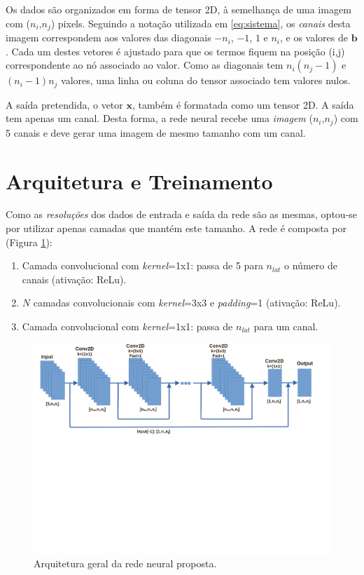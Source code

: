 \documentclass[final,5p]{elsarticle}
\numberwithin{equation}{section}
\begin{document}
    Os dados são organizados em forma de tensor 2D, à semelhança de uma imagem com ($n_i$,$n_j$) pixels. Seguindo a notação utilizada em \ref{eq:sistema}, os \emph{canais} desta imagem correspondem aos valores das diagonais $-n_i$, $-1$, $1$ e $n_i$, e os valores de $\textbf{b}$. Cada um destes vetores é ajustado para que os termos fiquem na posição (i,j) correspondente ao nó associado ao valor. Como as diagonais tem $n_i(n_j-1)$ e $(n_i-1)n_j$ valores, uma linha ou coluna do tensor associado tem valores nulos.

    A saída pretendida, o vetor $\textbf{x}$, também é formatada como um tensor 2D. A saída tem apenas um canal. Desta forma, a rede neural recebe uma \emph{imagem} ($n_i$,$n_j$) com 5 canais e deve gerar uma imagem de mesmo tamanho com um canal.

\section{Arquitetura e Treinamento}

    Como as \emph{resoluções} dos dados de entrada e saída da rede são as mesmas, optou-se por utilizar apenas camadas que mantém este tamanho. A rede é composta por (Figura \ref{fig:arquitetura}):

    \begin{enumerate}
        \item Camada convolucional com \emph{kernel}=1x1: passa de 5 para $n_{lat}$ o número de canais (ativação: ReLu).
        \item $N$ camadas convolucionais com \emph{kernel}=3x3 e \emph{padding}=1 (ativação: ReLu).
        \item Camada convolucional com \emph{kernel}=1x1: passa de $n_{lat}$ para um canal.
    \end{enumerate}

    \begin{figure}[hbt!]
        \centering
        \includegraphics[width=0.95\columnwidth, trim={0cm 7.8cm 1cm 0cm}, clip]{./fig/NN.png}
        \caption{Arquitetura geral da rede neural proposta.}\label{fig:arquitetura}
    \end{figure}
\end{document}
